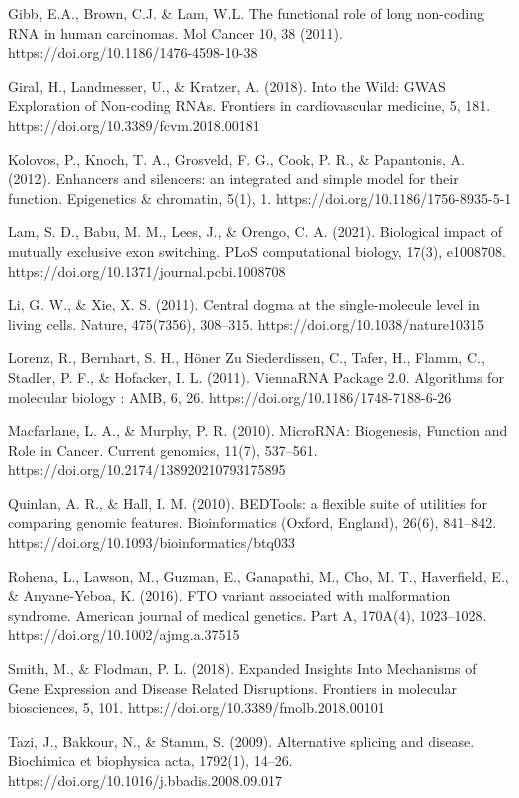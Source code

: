 \documentclass[11pt]{article}
\begin{document}
Gibb, E.A., Brown, C.J. & Lam, W.L. The functional role of long non-coding RNA in human carcinomas. Mol Cancer 10, 38 (2011). https://doi.org/10.1186/1476-4598-10-38 

Giral, H., Landmesser, U., & Kratzer, A. (2018). Into the Wild: GWAS Exploration of Non-coding  RNAs. Frontiers in cardiovascular medicine, 5, 181.  https://doi.org/10.3389/fcvm.2018.00181 

Kolovos, P., Knoch, T. A., Grosveld, F. G., Cook, P. R., & Papantonis, A. (2012). Enhancers and silencers: an integrated and simple model for their function. Epigenetics & chromatin, 5(1), 1. https://doi.org/10.1186/1756-8935-5-1 

Lam, S. D., Babu, M. M., Lees, J., & Orengo, C. A. (2021). Biological impact of mutually exclusive exon switching. PLoS computational biology, 17(3), e1008708. https://doi.org/10.1371/journal.pcbi.1008708 

Li, G. W., & Xie, X. S. (2011). Central dogma at the single-molecule level in living cells. Nature, 475(7356), 308–315. https://doi.org/10.1038/nature10315 

Lorenz, R., Bernhart, S. H., Höner Zu Siederdissen, C., Tafer, H., Flamm, C., Stadler, P. F., & Hofacker, I. L. (2011). ViennaRNA Package 2.0. Algorithms for molecular biology : AMB, 6, 26. https://doi.org/10.1186/1748-7188-6-26 

Macfarlane, L. A., & Murphy, P. R. (2010). MicroRNA: Biogenesis, Function and Role in Cancer. Current genomics, 11(7), 537–561. https://doi.org/10.2174/138920210793175895 

Quinlan, A. R., & Hall, I. M. (2010). BEDTools: a flexible suite of utilities for comparing genomic features. Bioinformatics (Oxford, England), 26(6), 841–842. https://doi.org/10.1093/bioinformatics/btq033 

Rohena, L., Lawson, M., Guzman, E., Ganapathi, M., Cho, M. T., Haverfield, E., & Anyane-Yeboa, K. (2016). FTO variant associated with malformation syndrome. American journal of medical genetics. Part A, 170A(4), 1023–1028. https://doi.org/10.1002/ajmg.a.37515 

Smith, M., & Flodman, P. L. (2018). Expanded Insights Into Mechanisms of Gene Expression and Disease Related Disruptions. Frontiers in molecular biosciences, 5, 101. https://doi.org/10.3389/fmolb.2018.00101 

Tazi, J., Bakkour, N., & Stamm, S. (2009). Alternative splicing and disease. Biochimica et biophysica acta, 1792(1), 14–26. https://doi.org/10.1016/j.bbadis.2008.09.017 
\end{document}
